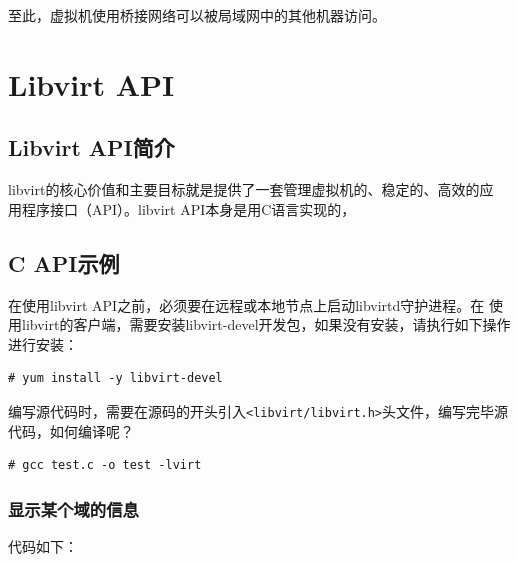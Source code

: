 至此，虚拟机使用桥接网络可以被局域网中的其他机器访问。

\section{Libvirt API}
\label{sec:libvirtAPI}

\subsection{Libvirt API简介}
\label{sec:introLibvirtAPI}

libvirt的核心价值和主要目标就是提供了一套管理虚拟机的、稳定的、高效的应
用程序接口（API）。libvirt API本身是用C语言实现的，

\subsection{C API示例}
\label{sec:libvirtCAPI}

在使用libvirt API之前，必须要在远程或本地节点上启动libvirtd守护进程。在
使用libvirt的客户端，需要安装libvirt-devel开发包，如果没有安装，请执行如下操作进行安装：

\begin{verbatim}
# yum install -y libvirt-devel
\end{verbatim}

编写源代码时，需要在源码的开头引入\verb|<libvirt/libvirt.h>|头文件，编写完毕源
代码，如何编译呢？

\begin{verbatim}
# gcc test.c -o test -lvirt
\end{verbatim}

\subsubsection{显示某个域的信息}
\label{sec:displayDomainInfo}

代码如下：


